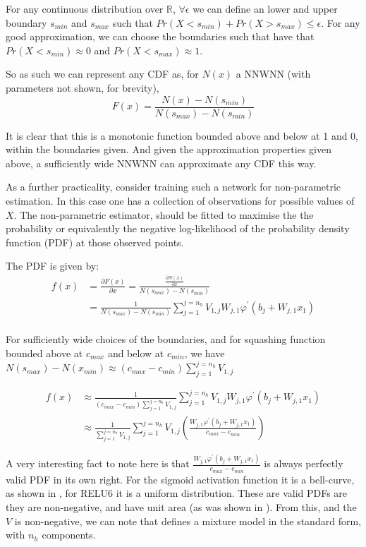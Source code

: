 \documentclass{article} %
\newcommand{\R}{\mathbb{R}}
\begin{document}
For any continuous distribution over $\R$, $\forall \epsilon$ we can define an lower and upper boundary $s_{min}$ and $s_{max}$ such that $Pr(X<s_{min})+Pr(X>s_{max}) \le \epsilon$.
For any good approximation, we can choose the boundaries such that have that $Pr(X<s_{min}) \approx 0$ and $Pr(X<s_{max}) \approx 1$.

So as such we can represent any CDF as,
for $N(x)$ a NNWNN (with parameters not shown, for brevity),
\begin{equation}
	F(x) = \frac{N(x) - N(s_{min})}{N(s_{max})-N(s_{min})}
\end{equation}

It is clear that this is a monotonic function bounded above and below at 1 and 0,
within the boundaries given.
And given the approximation properties given above,
a sufficiently wide NNWNN can approximate any CDF this way.

As a further practicality,
consider training such a network for non-parametric estimation.
In this case one has a collection of observations for possible values of $X$.
The non-parametric estimator, should be fitted to maximise the the probability or equivalently the negative log-likelihood of the probability density function (PDF) at those observed points.

The PDF is given by:
\begin{align}
f(x) &= \frac{\partial F(x)}{\partial x} =\frac{\frac{\partial N(x)}{\partial x}}{N(s_{max})-N(s_{min})} \\
%
&=\frac{1}{N(s_{max})-N(s_{min})} 
\sum_{j=1}^{j=n_h} V_{1,j}W_{j,1} \varphi^\prime (b_j+W_{j,1}x_1) \\
\end{align}

For sufficiently wide choices of the boundaries,
and for squashing function bounded above at $c_{max}$ and below at $c_{min}$,
we have $N(s_{max})-N(x_{min}) \approx (c_{max}-c_{min})\sum_{j=1}^{j=n_h} V_{1,j}$

\begin{align} \label{equ:pdf2}
f(x) &\approx \frac{1}{(c_{max}-c_{min})\sum_{j=1}^{j=n_h} V_{1,j}}  \sum_{j=1}^{j=n_h} V_{1,j}W_{j,1} \varphi^\prime (b_j+W_{j,1}x_1)\\
%
&\approx \frac{1}{\sum_{j=1}^{j=n_h} V_{1,j}}  \sum_{j=1}^{j=n_h} V_{1,j}
\left( \frac{W_{j,1} \varphi^\prime (b_j+W_{j,1}x_1)}{c_{max}-c_{min}} \right)
\end{align}

A very interesting fact to note here is that $\frac{W_{j,1} \varphi^\prime (b_j+W_{j,1}x_1)}{c_{max}-c_{min}}$ is always perfectly valid PDF in its own right.
For the sigmoid activation function it is a bell-curve, as shown in , for RELU6 it is a uniform distribution.
These are valid PDFs are they are non-negative, and have unit area (as was shown in ).
From this, and the $V$ is non-negative, we can note that  defines a mixture model in the standard form, with $n_h$ components.
\end{document}
